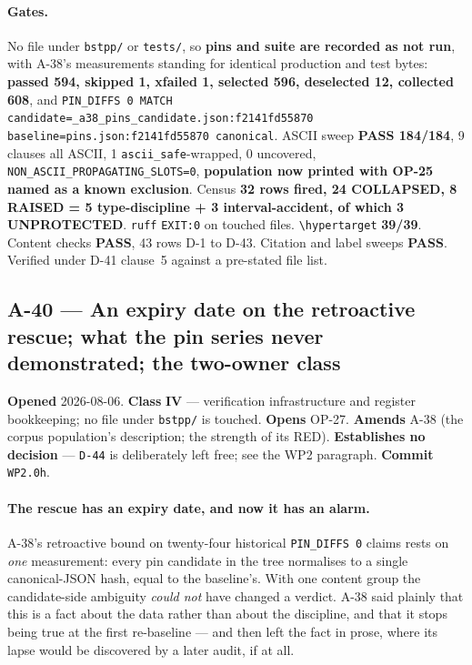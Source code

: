\documentclass[
  10pt,
]{article}
\begin{document}
\paragraph{Gates.}
No file under \texttt{bstpp/} or \texttt{tests/}, so \textbf{pins and suite are recorded as not run}, with A-38's measurements standing for identical production and test bytes: \textbf{passed 594, skipped 1, xfailed 1, selected 596, deselected 12, collected 608}, and \texttt{PIN\_DIFFS 0 MATCH candidate=\allowbreak{}\_a38\_pins\_candidate.json:\allowbreak{}f2141fd55870 baseline=\allowbreak{}pins.json:\allowbreak{}f2141fd55870 canonical}. ASCII sweep \textbf{PASS 184/184}, 9 clauses all ASCII, 1 \texttt{ascii\_safe}-wrapped, 0 uncovered, \texttt{NON\_ASCII\_PROPAGATING\_SLOTS=0}, \textbf{population now printed with OP-25 named as a known exclusion}. Census \textbf{32 rows fired, 24 COLLAPSED, 8 RAISED = 5 type-discipline + 3 interval-accident, of which 3 UNPROTECTED}. \texttt{ruff} \texttt{EXIT:0} on touched files. \texttt{\textbackslash hypertarget} \textbf{39/39}. Content checks \textbf{PASS}, 43 rows D-1 to D-43. Citation and label sweeps \textbf{PASS}. Verified under D-41 clause~5 against a pre-stated file list.

\hypertarget{a-40}{%
\subsection{A-40 --- An expiry date on the retroactive rescue; what the pin series never demonstrated; the two-owner class}\label{a-40}}

\textbf{Opened} 2026-08-06. \textbf{Class} \textbf{IV} --- verification infrastructure and register bookkeeping; no file under \texttt{bstpp/} is touched. \textbf{Opens} OP-27. \textbf{Amends} A-38 (the corpus population's description; the strength of its RED). \textbf{Establishes no decision} --- \texttt{D-44} is deliberately left free; see the WP2 paragraph. \textbf{Commit} \texttt{WP2.0h}.

\paragraph{The rescue has an expiry date, and now it has an alarm.}
A-38's retroactive bound on twenty-four historical \texttt{PIN\_DIFFS 0} claims rests on \emph{one} measurement: every pin candidate in the tree normalises to a single canonical-JSON hash, equal to the baseline's. With one content group the candidate-side ambiguity \emph{could not} have changed a verdict. A-38 said plainly that this is a fact about the data rather than about the discipline, and that it stops being true at the first re-baseline --- and then left the fact in prose, where its lapse would be discovered by a later audit, if at all.
\end{document}
